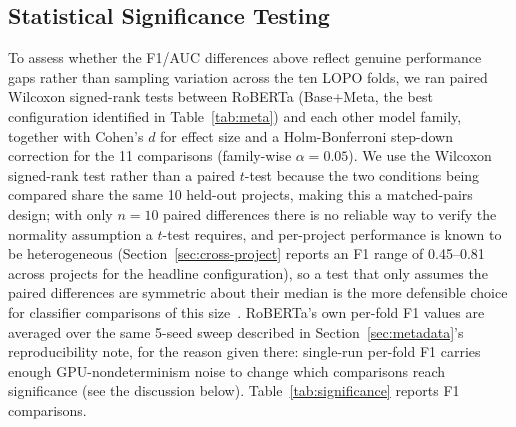 \documentclass[preprint,12pt]{elsarticle}
\begin{document}
\subsection{Statistical Significance Testing}
\label{sec:significance}

To assess whether the F1/AUC differences above reflect genuine performance gaps rather than sampling variation across the ten LOPO folds, we ran paired Wilcoxon signed-rank tests between RoBERTa (Base+Meta, the best configuration identified in Table~\ref{tab:meta}) and each other model family, together with Cohen's $d$ for effect size and a Holm-Bonferroni step-down correction for the 11 comparisons (family-wise $\alpha=0.05$). We use the Wilcoxon signed-rank test rather than a paired $t$-test because the two conditions being compared share the same 10 held-out projects, making this a matched-pairs design; with only $n=10$ paired differences there is no reliable way to verify the normality assumption a $t$-test requires, and per-project performance is known to be heterogeneous (Section~\ref{sec:cross-project} reports an F1 range of 0.45--0.81 across projects for the headline configuration), so a test that only assumes the paired differences are symmetric about their median is the more defensible choice for classifier comparisons of this size~\cite{carrasco2020statistical}. RoBERTa's own per-fold F1 values are averaged over the same 5-seed sweep described in Section~\ref{sec:metadata}'s reproducibility note, for the reason given there: single-run per-fold F1 carries enough GPU-nondeterminism noise to change which comparisons reach significance (see the discussion below). Table~\ref{tab:significance} reports F1 comparisons.
\end{document}
